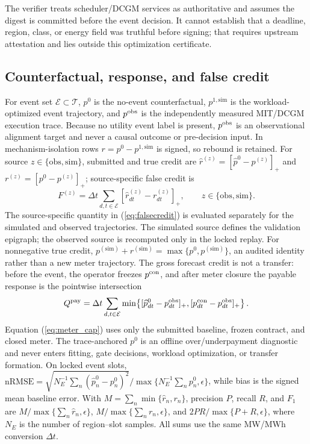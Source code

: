 \documentclass[10pt,journal]{IEEEtran}
\newcommand{\dt}{\Delta t}
\begin{document}
The verifier treats scheduler/DCGM services as authoritative and assumes the
digest is committed before the event decision. It cannot establish that a
deadline, region, class, or energy field was truthful before signing; that
requires upstream attestation and lies outside this optimization certificate.

\subsection{Counterfactual, response, and false credit}

For event set $\mathcal E\subset\mathcal T$, $p^0$ is the no-event
counterfactual, $p^{1,\mathrm{sim}}$ is the workload-optimized event trajectory,
and $p^{\rm obs}$ is the independently measured MIT/DCGM execution trace.
Because no utility event label is present, $p^{\rm obs}$ is an observational
alignment target and never a causal outcome or pre-decision input. In
mechanism-isolation rows \(r=p^0-p^{1,\mathrm{sim}}\) is signed, so rebound is
retained. For source \(z\in\{\mathrm{obs},\mathrm{sim}\}\), submitted and true
credit are \(\widehat r^{(z)}=[\widehat p^0-p^{(z)}]_+\) and
\(r^{(z)}=[p^0-p^{(z)}]_+\); source-specific false credit is
\begin{equation}
 F^{(z)}=\dt\sum_{d,t\in\mathcal E}
 [\widehat r^{(z)}_{dt}-r^{(z)}_{dt}]_+,
 \qquad z\in\{\mathrm{obs},\mathrm{sim}\}.
 \label{eq:falsecredit}
\end{equation}
The source-specific quantity in (\ref{eq:falsecredit}) is evaluated separately
for the simulated and observed trajectories. The simulated source defines the
validation epigraph; the observed source is recomputed only in the locked
replay. For nonnegative true credit,
\(p^{(\mathrm{sim})}+r^{(\mathrm{sim})}
=\max\{p^0,p^{(\mathrm{sim})}\}\), an audited identity rather than a new meter
trajectory. The gross forecast credit is not a transfer: before the event,
the operator freezes \(p^{\rm con}\), and after meter closure the payable
response is the pointwise intersection
\begin{equation}
Q^{\rm pay}=\dt\sum_{d,t\in\mathcal E}
\min\!\left\{[\widehat p^0_{dt}-p^{\rm obs}_{dt}]_+,
 [p^{\rm con}_{dt}-p^{\rm obs}_{dt}]_+\right\}.
\label{eq:meter_cap}
\end{equation}
Equation (\ref{eq:meter_cap}) uses only the submitted baseline, frozen contract,
and closed meter. The trace-anchored $p^0$ is an offline over/underpayment
diagnostic and never enters fitting, gate decisions, workload optimization, or
transfer formation. On locked event slots,
\(\mathrm{nRMSE}=\sqrt{N_E^{-1}\sum_n(\widehat p^0_n-p^0_n)^2}/
\max\{N_E^{-1}\sum_n p^0_n,\epsilon\}\), while bias is the signed mean baseline
error. With \(M=\sum_n\min\{\widehat r_n,r_n\}\), precision \(P\), recall \(R\),
and \(F_1\) are \(M/\max\{\sum_n\widehat r_n,\epsilon\}\),
\(M/\max\{\sum_n r_n,\epsilon\}\), and
\(2PR/\max\{P+R,\epsilon\}\), where \(N_E\) is the number of region--slot
samples. All sums use the same MW/MWh conversion \(\dt\).
\end{document}
